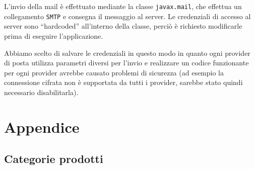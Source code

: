 L'invio della mail è effettuato mediante la classe \texttt{javax.mail}, che effettua un collegamento \texttt{SMTP} e consegna il messaggio al server. Le credenziali di accesso al server sono ``hardcoded'' all'interno della classe, perciò è richiesto modificarle prima di eseguire l'applicazione.

Abbiamo scelto di salvare le credenziali in questo modo in quanto ogni provider di posta utilizza parametri diversi per l'invio e realizzare un codice funzionante per ogni provider avrebbe causato problemi di sicurezza (ad esempio la connessione cifrata non è supportata da tutti i provider, sarebbe stato quindi necessario disabilitarla).

\chapter{Appendice}
\section{Categorie prodotti}


